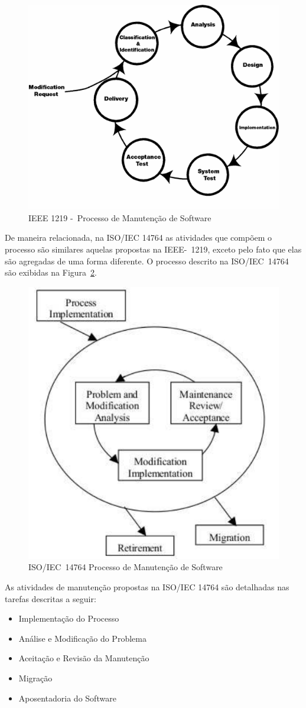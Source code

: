\begin{figure}[htpb] \centering
	\includegraphics[width=0.5\linewidth]{./chapter-manutencao-software-visao-geral/img/ieee_1219_98_processo_manutencao.png}
	\caption{IEEE 1219 -~Processo de Manutenção de
		Software}\label{fig:ieee-1219-processo-man-software}
\end{figure}

De maneira relacionada, na ISO/IEC 14764 as atividades que compõem o processo
são similares aquelas propostas na IEEE-~1219, exceto pelo fato que elas são
agregadas de uma forma diferente. O processo descrito na ISO/IEC~14764 são
exibidas na Figura~\ref{fig:ieee-14764-processo-manutencao}.

\begin{figure}[htpb] \centering
	\includegraphics[width=0.5\linewidth]
{chapter-manutencao-software-visao-geral/img/ieee-14764-processo-manutencao.pdf}
	\caption{ISO/IEC~14764 Processo de Manutenção de Software}
\label{fig:ieee-14764-processo-manutencao} \end{figure}

As atividades de manutenção propostas na ISO/IEC 14764 são detalhadas nas
tarefas descritas a seguir:

\begin{itemize}
   	\item Implementação do Processo
   	\item Análise e Modificação do
		Problema
	\item Aceitação e Revisão da Manutenção
   	\item Migração
   	\item Aposentadoria do Software
\end{itemize}

